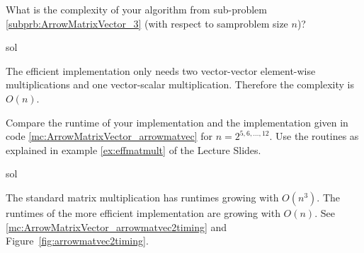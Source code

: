 \begin{samproblem}
\begin{subproblem}
What is the complexity of your algorithm from sub-problem
\ref{subprb:ArrowMatrixVector_3} (with respect to samproblem size $n$)?
 \begin{samwriteprbpart}{sol}
\begin{samsolution}
  The efficient implementation only needs two vector-vector element-wise multiplications and
  one vector-scalar multiplication. Therefore the complexity is $O(n)$.
\end{samsolution}
\end{samwriteprbpart}
\end{subproblem}


\begin{subproblem}
  Compare the runtime of your implementation and the implementation given in code
  \ref{mc:ArrowMatrixVector_arrowmatvec} for $n=2^{5,6,\ldots,12}$.
  Use the routines as explained in example
  \ref{ex:effmatmult} of the Lecture Slides.
 \begin{samwriteprbpart}{sol}
\begin{samsolution}
The standard matrix multiplication has runtimes growing with $O(n^3)$.
The runtimes of the more efficient implementation are growing with $O(n)$.
See \autoref{mc:ArrowMatrixVector_arrowmatvec2timing} and Figure~\ref{fig:arrowmatvec2timing}.

% 

\end{samsolution}
\end{samwriteprbpart}
\end{subproblem}

\end{samproblem}
